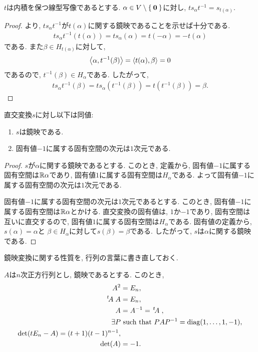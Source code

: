 \begin{prop}
  \label{prop:conjbyortho}
  $t$は内積を保つ線型写像であるとする.
  $\alpha\in V\setminus\Set{\boldsymbol{0}}$に対し,
  $ts_\alpha t^{-1}=s_{t(\alpha)}$.
\end{prop}
\begin{proof}
より,
  $ts_\alpha t^{-1}$が$t(\alpha)$に関する鏡映であることを示せば十分である.
\begin{align*}
  ts_\alpha t^{-1}(t(\alpha))=ts_\alpha(\alpha)=t(-\alpha)=-t(\alpha)
\end{align*}
である. また$\beta\in H_{t(\alpha)}$に対して,
\begin{align*}
\Braket{\alpha,t^{-1}(\beta)}
=\Braket{t(\alpha),\beta}
=0
\end{align*}
であるので, $t^{-1}(\beta)\in H_\alpha$である.
したがって,
\begin{align*}
  ts_\alpha t^{-1}(\beta)=ts_\alpha(t^{-1}(\beta))=t(t^{-1}(\beta))=\beta.
\end{align*}
\end{proof}

\begin{prop}
  直交変換$s$に対し以下は同値:
  \begin{enumerate}
  \item $s$は鏡映である.
  \item 固有値$-1$に属する固有空間の次元は$1$次元である.
  \end{enumerate}
\end{prop}
\begin{proof}
  $s$が$\alpha$に関する鏡映であるとする.
  このとき, 定義から,
  固有値$-1$に属する固有空間は$\mathbb{R}\alpha$であり,
  固有値$1$に属する固有空間は$H_\alpha$である.
  よって固有値$-1$に属する固有空間の次元は$1$次元である.

  固有値$-1$に属する固有空間の次元は$1$次元であるとする.
  このとき, 固有値$-1$に属する固有空間は$\mathbb{R}\alpha$とかける.
  直交変換の固有値は, $1$か$-1$であり, 固有空間は互いに直交するので,
  固有値$1$に属する固有空間は$H_\alpha$である.
  固有値の定義から,
  $s(\alpha)=\alpha$と
  $\beta\in H_\alpha$に対して$s(\beta)=\beta$である.
  したがって,
  $s$は$\alpha$に関する鏡映である.
\end{proof}

鏡映変換に関する性質を, 行列の言葉に書き直しておく.
\begin{cor}
  $A$は$n$次正方行列とし, 鏡映であるとする.
  このとき,
  \begin{align*}
    A^2&=E_n,\\
    \left.^{t}\!A\right.A&=E_n,\\
    A&=A^{-1}=\left.^{t}\!A\right.,\\
    \exists P &\text{ such that } PAP^{-1}=\operatorname{diag}(1,\ldots,1,-1),\\
    \det(tE_n-A)=(t+1)(t-1)^{n-1},\\
    \det(A)&=-1.
  \end{align*}
\end{cor}



